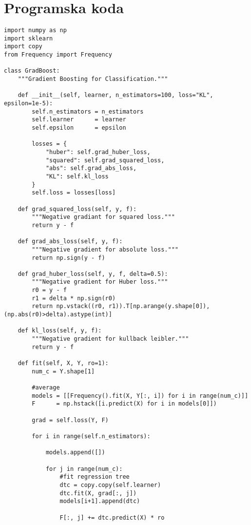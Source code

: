 \documentclass[a4paper,11pt]{article}
\begin{document}
\appendix
\appendixpage

\section{\label{app-code}Programska koda}


\begin{lstlisting}
import numpy as np
import sklearn
import copy
from Frequency import Frequency

class GradBoost:
    """Gradient Boosting for Classification."""

    def __init__(self, learner, n_estimators=100, loss="KL", epsilon=1e-5):
        self.n_estimators = n_estimators
        self.learner      = learner
        self.epsilon      = epsilon

        losses = {
            "huber": self.grad_huber_loss,
            "squared": self.grad_squared_loss,
            "abs": self.grad_abs_loss,
            "KL": self.kl_loss
        }
        self.loss = losses[loss]

    def grad_squared_loss(self, y, f):
        """Negative gradiant for squared loss."""
        return y - f

    def grad_abs_loss(self, y, f):
        """Negative gradient for absolute loss."""
        return np.sign(y - f)

    def grad_huber_loss(self, y, f, delta=0.5):
        """Negative gradient for Huber loss."""
        r0 = y - f
        r1 = delta * np.sign(r0)
        return np.vstack((r0, r1)).T[np.arange(y.shape[0]), (np.abs(r0)>delta).astype(int)]

    def kl_loss(self, y, f):
        """Negative gradient for kullback leibler."""
        return y - f

    def fit(self, X, Y, ro=1):
        num_c = Y.shape[1]

        #average
        models = [[Frequency().fit(X, Y[:, i]) for i in range(num_c)]]
        F      = np.hstack([i.predict(X) for i in models[0]])

        grad = self.loss(Y, F)

        for i in range(self.n_estimators):

            models.append([])

            for j in range(num_c):
                #fit regression tree
                dtc = copy.copy(self.learner)
                dtc.fit(X, grad[:, j])
                models[i+1].append(dtc)

                F[:, j] += dtc.predict(X) * ro


\end{lstlisting}
\end{document}
